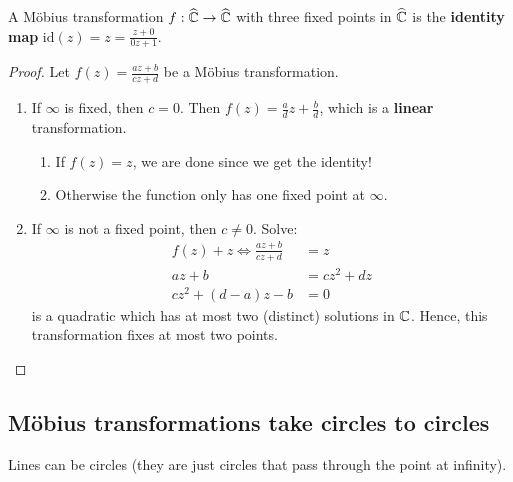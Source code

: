 \documentclass[12pt]{article}
\begin{document}
\begin{theorem}
    A Möbius transformation $f:\widehat{\mathbb{C}}\to\widehat{\mathbb{C}}$ with three fixed points in $\widehat{\mathbb{C}}$ is the \textbf{identity map} $\mathrm{id}(z)=z=\frac{z+0}{0z+1}$.
\end{theorem}
\begin{proof}
    Let $f(z)=\frac{az+b}{cz+d}$ be a Möbius transformation.
    \begin{enumerate}
        \item If $\infty$ is fixed, then $c=0$. Then $f(z)=\frac{a}{d}z+\frac{b}{d}$, which is a \textbf{linear} transformation.\begin{enumerate}
            \item If $f(z)=z$, we are done since we get the identity!
            \item Otherwise the function only has one fixed point at $\infty$.
        \end{enumerate}
        \item If $\infty$ is not a fixed point, then $c\neq 0$. Solve:\begin{align*}
            f(z)+z \Leftrightarrow \frac{az+b}{cz+d}&=z\\
            az+b&=cz^2+dz\\
            cz^2+(d-a)z-b&=0
        \end{align*}
        is a quadratic which has at most two (distinct) solutions in $\mathbb{C}$. Hence, this transformation fixes at most two points.
    \end{enumerate}
\end{proof}

\subsection{Möbius transformations take circles to circles}
\rmk Lines can be circles (they are just circles that pass through the point at infinity).
\end{document}

